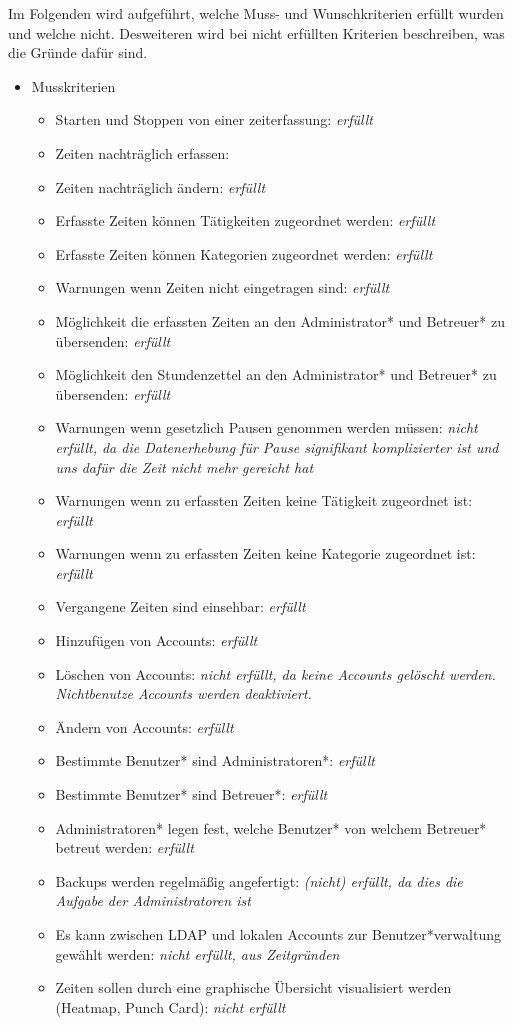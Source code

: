 Im Folgenden wird aufgeführt, welche Muss- und Wunschkriterien erfüllt wurden und welche nicht. Desweiteren wird bei nicht erfüllten Kriterien beschreiben, was die Gründe dafür sind.

\begin{itemize}
  \item Musskriterien
    \begin{itemize}
      \item Starten und Stoppen von einer zeiterfassung: \emph{erfüllt}
      \item Zeiten nachträglich erfassen:  
      \item Zeiten nachträglich ändern: \emph{erfüllt}
      \item Erfasste Zeiten können Tätigkeiten zugeordnet werden: \emph{erfüllt}
      \item Erfasste Zeiten können Kategorien zugeordnet werden: \emph{erfüllt}
      \item Warnungen wenn Zeiten nicht eingetragen sind: \emph{erfüllt}
      \item Möglichkeit die erfassten Zeiten an den Administrator* und Betreuer* zu übersenden: \emph{erfüllt}
	    \item Möglichkeit den Stundenzettel an den Administrator* und Betreuer* zu übersenden: \emph{erfüllt}
	    \item Warnungen wenn gesetzlich Pausen genommen werden müssen: \emph{nicht erfüllt, da die Datenerhebung für Pause signifikant komplizierter ist und uns dafür die Zeit nicht mehr gereicht hat}
	    \item Warnungen wenn zu erfassten Zeiten keine Tätigkeit zugeordnet ist: \emph{erfüllt}
	    \item Warnungen wenn zu erfassten Zeiten keine Kategorie zugeordnet ist: \emph{erfüllt}
	    \item Vergangene Zeiten sind einsehbar: \emph{erfüllt}
    	\item Hinzufügen von Accounts: \emph{erfüllt}
    	\item Löschen von Accounts: \emph{nicht erfüllt, da keine Accounts gelöscht werden. Nichtbenutze Accounts werden deaktiviert.}
    	\item Ändern von Accounts: \emph{erfüllt}
    	\item Bestimmte Benutzer* sind Administratoren*: \emph{erfüllt}
    	\item Bestimmte Benutzer* sind Betreuer*: \emph{erfüllt}
    	\item Administratoren* legen fest, welche Benutzer* von welchem Betreuer* betreut werden: \emph{erfüllt}
    	\item Backups werden regelmäßig angefertigt: \emph{(nicht) erfüllt, da dies die Aufgabe der Administratoren ist}
    	\item Es kann zwischen LDAP und lokalen Accounts zur Benutzer*verwaltung gewählt werden: \emph{nicht erfüllt, aus Zeitgründen}
    	\item Zeiten sollen durch eine graphische Übersicht visualisiert werden (Heatmap, Punch Card): \emph{nicht erfüllt}
    \end{itemize}
    

\end{itemize}
